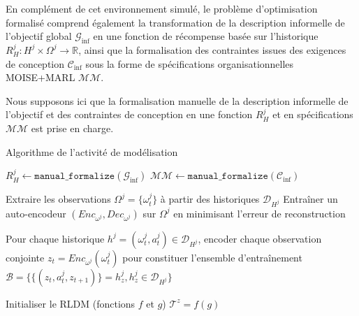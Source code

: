 En complément de cet environnement simulé, le problème d'optimisation formalisé comprend également la transformation de la description informelle de l'objectif global $\mathcal{G}_{\text{inf}}$ en une fonction de récompense basée sur l'historique $R^j_H: H^j \times \Omega^j \rightarrow \mathbb{R}$, ainsi que la formalisation des contraintes issues des exigences de conception $\mathcal{C}_{\text{inf}}$ sous la forme de spécifications organisationnelles MOISE+MARL $\mathcal{MM}$.

Nous supposons ici que la formalisation manuelle de la description informelle de l'objectif et des contraintes de conception en une fonction $R^j_H$ et en spécifications $\mathcal{MM}$ est prise en charge.


\begin{algorithm}[H]
  \caption{Algorithme de l'activité de modélisation}
  \label{alg:modeling}
  \DontPrintSemicolon


  \vspace{0.5em}
  $R^j_H \gets \texttt{manual\_formalize}(\mathcal{G}_{\text{inf}})$ \;
  $\mathcal{MM} \gets \texttt{manual\_formalize}(\mathcal{C}_{\text{inf}})$ \;

  \vspace{0.5em}
  Extraire les observations $\Omega^j = \{\omega^j_t\}$ à partir des historiques $\mathcal{D}_{H^j}$ \;
  Entraîner un auto-encodeur $(Enc_{\omega^j}, Dec_{\omega^j})$ sur $\Omega^j$ en minimisant l'erreur de reconstruction \;

  \vspace{0.5em}
  Pour chaque historique $h^j = (\omega_t^j, a_t^j) \in \mathcal{D}_{H^j}$, encoder chaque observation conjointe ${z}_t = Enc_{\omega^j}(\omega^j_t)$ pour constituer l'ensemble d'entraînement $\mathcal{B} = \{ \{(z_t, a^j_t, z_{t+1})\} = h_z^j, h_z^j \in \mathcal{D}_{H^j}\}$

  \vspace{0.5em}
  Initialiser le RLDM (fonctions $f$ et $g$) $\mathcal{T}^z = f(g)$


\end{algorithm}
